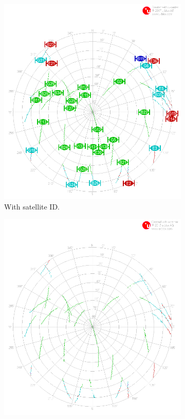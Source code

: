 \documentclass[letterpaper, 10 pt,onecolumn]{article}
\begin{document}
	\begin{figure}[H]
		\centering
		\begin{subfigure}{.5\textwidth}
			\includegraphics[width=\linewidth]{../Moving_SingleBand/skyplot.png}
			\caption{With satellite ID.}
			\label{fig:mt1_sky}
		\end{subfigure}%
		\hfill
		\begin{subfigure}{.5\textwidth}
			\includegraphics[width=\linewidth]{../Moving_SingleBand/skyplot_orbit.png}

\end{subfigure}
\end{figure}
\end{document}
